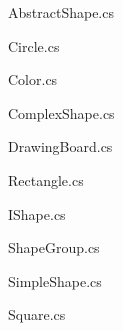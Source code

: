 \documentclass[a3paper]{article}
\newcommand{\cssFile}[2]{#1/#2}
\newcommand{\CSharpPath}{../SmellyShapes/Source}
\newcommand{\importFile}[1]
{ 
 {#1} }
}
\begin{document}
\begin{multicols*}{4}

\importFile{AbstractShape.cs}
\importFile{Circle.cs}
\vfill\null
\columnbreak

\importFile{Color.cs}
\importFile{ComplexShape.cs}
\importFile{DrawingBoard.cs}
\vfill\null
\columnbreak

\importFile{Rectangle.cs}
\importFile{IShape.cs}
\importFile{ShapeGroup.cs}
\importFile{SimpleShape.cs}
\vfill\null
\columnbreak

\importFile{Square.cs}

\end{multicols*}
\end{document}
